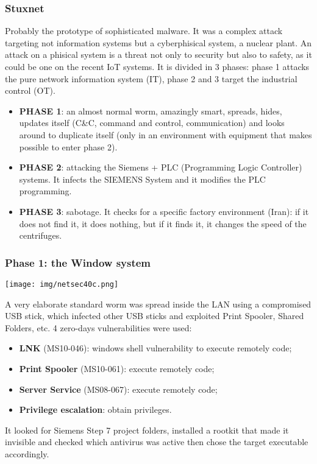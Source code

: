 \documentclass[a4paper, 10pt, titlepage]{article}
\begin{document}
\subsubsection{Stuxnet}
Probably the prototype of sophisticated malware. It was a complex attack targeting not information systems but a cyberphisical system, a nuclear plant. An attack on a phisical system is a threat not only to security but also to safety, as it could be one on the recent IoT systems. It is divided in 3 phases: phase 1 attacks the pure network information system (IT), phase 2 and 3 target the industrial control (OT).
\begin{itemize}
	\item \textbf{PHASE 1}: an almost normal worm, amazingly smart, spreads, hides, updates itself (C\&C, command and control, communication) and looks around to duplicate itself (only in an environment with equipment that makes possible to enter phase 2).
	\item \textbf{PHASE 2}: attacking the Siemens + PLC (Programming Logic Controller) systems. It infects the SIEMENS System and it modifies the PLC programming.
	\item \textbf{PHASE 3}: sabotage. It checks for a specific factory environment (Iran): if it does not find it, it does nothing, but if it finds it, it changes the speed of the centrifuges.
\end{itemize}

\subsubsection*{Phase 1: the Window system}
\begin{minipage}{0.35\textwidth}
	\begin{center}
		\texttt{[image: img/netsec40c.png]}
	\end{center}
\end{minipage}
\hfill
\begin{minipage}{0.6\textwidth}
A very elaborate standard worm was spread inside the LAN using a compromised USB stick, which infected other USB sticks and exploited Print Spooler, Shared Folders, etc.
4 zero-days vulnerabilities were used:
\begin{itemize}
	\item \textbf{LNK} (MS10-046): windows shell vulnerability to execute remotely code;
	\item \textbf{Print Spooler} (MS10-061): execute remotely code;
	\item \textbf{Server Service} (MS08-067): execute remotely code;
	\item \textbf{Privilege escalation}: obtain privileges.
\end{itemize}
It looked for Siemens Step 7 project folders, installed a rootkit that made it invisible and checked which antivirus was active then chose the target executable accordingly.
\end{minipage}
\end{document}
